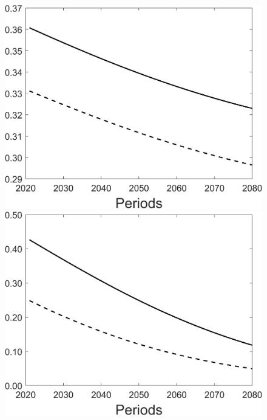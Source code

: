 \begin{figure}[h!!]
\begin{minipage}[]{0.32\textwidth}
	\end{minipage}
	\begin{minipage}[]{0.32\textwidth}
		\includegraphics[width=1\textwidth]{../../codding_model/Own/figures/Rep_agent/staticBAU_LF_separate_hl_periods59_eppsilon0.40_zeta1.40_Ad08_Ac04_thetac0.70_thetad0.56_HetGrowth1_tauul0.181_util0_withtarget0_lgd0.png}
	\end{minipage}
	\begin{minipage}[]{0.32\textwidth}
	\includegraphics[width=1\textwidth]{../../codding_model/Own/figures/Rep_agent/staticBAU_LF_separate_pd_periods59_eppsilon0.40_zeta1.40_Ad08_Ac04_thetac0.70_thetad0.56_HetGrowth1_tauul0.181_util0_withtarget0_lgd0.png}

\end{minipage}
\end{figure}
